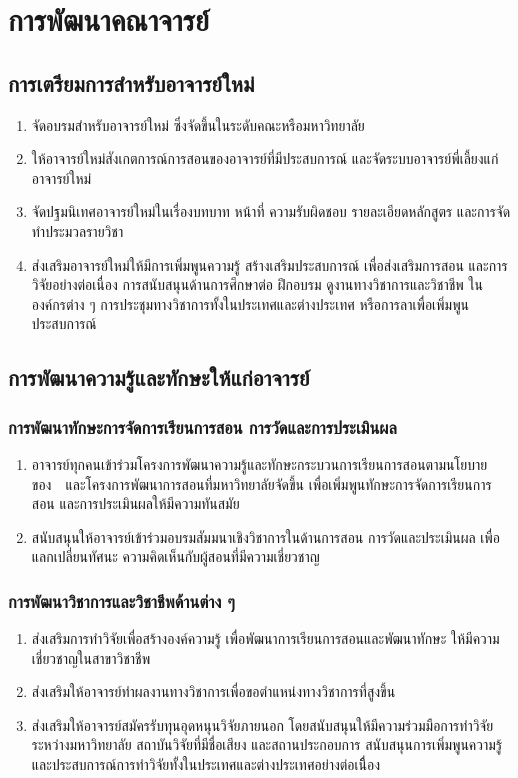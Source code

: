 \chapter{การพัฒนาคณาจารย์}
\section{การเตรียมการสำหรับอาจารย์ใหม่}
\begin{enumerate}
   	\item จัดอบรมสำหรับอาจารย์ใหม่ ซึ่งจัดขึ้นในระดับคณะหรือมหาวิทยาลัย
   	\item ให้อาจารย์ใหม่สังเกตการณ์การสอนของอาจารย์ที่มีประสบการณ์ และจัดระบบอาจารย์พี่เลี้ยงแก่อาจารย์ใหม่
   	\item จัดปฐมนิเทศอาจารย์ใหม่ในเรื่องบทบาท หน้าที่ ความรับผิดชอบ รายละเอียดหลักสูตร และการจัดทำประมวลรายวิชา
   	\item ส่งเสริมอาจารย์ใหม่ให้มีการเพิ่มพูนความรู้ สร้างเสริมประสบการณ์ เพื่อส่งเสริมการสอน และการวิจัยอย่างต่อเนื่อง การสนับสนุนด้านการศึกษาต่อ ฝึกอบรม ดูงานทางวิชาการและวิชาชีพ ในองค์กรต่าง ๆ การประชุมทางวิชาการทั้งในประเทศและต่างประเทศ หรือการลาเพื่อเพิ่มพูนประสบการณ์	
   	\end{enumerate} 
   		
   \section{การพัฒนาความรู้และทักษะให้แก่อาจารย์}

\subsection{การพัฒนาทักษะการจัดการเรียนการสอน การวัดและการประเมินผล}
\begin{enumerate}
   	\item อาจารย์ทุกคนเข้าร่วมโครงการพัฒนาความรู้และทักษะกระบวนการเรียนการสอนตามนโยบายของ\university \,\,\,\,\,\,และโครงการพัฒนาการสอนที่มหาวิทยาลัยจัดขึ้น เพื่อเพิ่มพูนทักษะการจัดการเรียนการสอน และการประเมินผลให้มีความทันสมัย
   	\item สนับสนุนให้อาจารย์เข้าร่วมอบรมสัมมนาเชิงวิชาการในด้านการสอน การวัดและประเมินผล เพื่อแลกเปลี่ยนทัศนะ ความคิดเห็นกับผู้สอนที่มีความเชี่ยวชาญ
   	\end{enumerate} 
   	
  \subsection{การพัฒนาวิชาการและวิชาชีพด้านต่าง ๆ}
  \begin{enumerate}
   	\item ส่งเสริมการทำวิจัยเพื่อสร้างองค์ความรู้ เพื่อพัฒนาการเรียนการสอนและพัฒนาทักษะ ให้มีความเชี่ยวชาญในสาขาวิชาชีพ
   	\item ส่งเสริมให้อาจารย์ทำผลงานทางวิชาการเพื่อขอตำแหน่งทางวิชาการที่สูงขึ้น
   	\item ส่งเสริมให้อาจารย์สมัครรับทุนอุดหนุนวิจัยภายนอก โดยสนับสนุนให้มีความร่วมมือการทำวิจัยระหว่างมหาวิทยาลัย สถาบันวิจัยที่มีชื่อเสียง และสถานประกอบการ สนับสนุนการเพิ่มพูนความรู้และประสบการณ์การทำวิจัยทั้งในประเทศและต่างประเทศอย่างต่อเนื่ิอง 
   	   	\end{enumerate} 
   	
   	
   	
   	
   	
   	
   	
   	